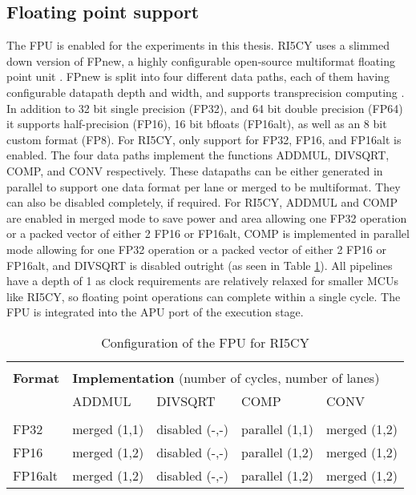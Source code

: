 \documentclass[../bachelor_paper.tex]{subfiles}
\begin{document}
\subsection{Floating point support}
    \label{sub:plat/ip/fpu}
The \ac{FPU} is enabled for the experiments in this thesis. RI5CY uses a slimmed down version of FPnew, a highly configurable open-source multiformat floating point unit \cite{machFPnewOpenSourceMultiformat2021}. FPnew is split into four different data paths, each of them having configurable datapath depth and width, and supports transprecision computing \cite{malossiTransprecisionComputingParadigm2018}. In addition to 32 bit single precision (FP32), and 64 bit double precision (FP64) it supports half-precision (FP16), 16 bit bfloats (FP16alt), as well as an 8 bit custom format (FP8). For RI5CY, only support for FP32, FP16, and FP16alt is enabled. The four data paths implement the functions \ac{ADDMUL}, \ac{DIVSQRT}, \ac{COMP}, and \ac{CONV} respectively. These datapaths can be either generated in parallel to support one data format per lane or merged to be multiformat. They can also be disabled completely, if required. For RI5CY, \ac{ADDMUL} and \ac{COMP} are enabled in merged mode to save power and area allowing one FP32 operation or a packed vector of either 2 FP16 or FP16alt, \ac{COMP} is implemented in parallel mode allowing for one FP32 operation or a packed vector of either 2 FP16 or FP16alt, and \ac{DIVSQRT} is disabled outright (as seen in Table \ref{tab:plat/base/fpu}). All pipelines have a depth of 1 as clock requirements are relatively relaxed for smaller \acp{MCU} like RI5CY, so floating point operations can complete within a single cycle. The \ac{FPU} is integrated into the \ac{APU} port of the execution stage.

\begin{table}
    \centering
    \begin{tabular}{lllll}
        \hline \\[-0.9em]
        \textbf{Format} & \multicolumn{4}{l}{\textbf{Implementation} (number of cycles, number of lanes)}   \\
                        & \ac{ADDMUL}   & \ac{DIVSQRT}  & \ac{COMP}     & \ac{CONV}     \\
        \hline \\[-0.9em]
        FP32            & merged (1,1)  & disabled (-,-)& parallel (1,1)& merged (1,2)  \\
        FP16            & merged (1,2)  & disabled (-,-)& parallel (1,2)& merged (1,2)  \\
        FP16alt         & merged (1,2)  & disabled (-,-)& parallel (1,2)& merged (1,2)  \\
        \hline
    \end{tabular}
    \caption{Configuration of the FPU for RI5CY \cite{machFPnewOpenSourceMultiformat2021}}
    \label{tab:plat/base/fpu}
\end{table}
\end{document}
